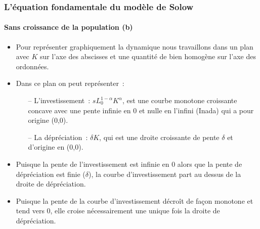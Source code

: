 \documentclass[10pt,notheorems]{beamer}
\theoremstyle{plain}
\theoremstyle{definition} %
\begin{document}
\begin{frame}
  \frametitle{L'équation fondamentale du modèle de Solow}
  \framesubtitle{Sans croissance de la population (b)}

  \bigskip

  \begin{itemize}

  \item Pour représenter graphiquement la dynamique nous travaillons dans un plan avec $K$ sur l'axe des abscisses et une quantité de bien homogène sur l'axe des ordonnées.\newline

  \item Dans ce plan on peut représenter~:
    \medskip
    \begin{itemize}
    \item[--] {\color{blue} L'investissement~:} $sL_0^{1-\alpha}K^{\alpha}$, est une courbe monotone croissante concave avec une pente infinie en 0 et nulle en l'infini (Inada) qui a pour origine (0,0).\newline
    \item[--] {\color{blue} La dépréciation~:} $\delta K$, qui est une droite croissante de pente $\delta$ et d'origine en (0,0).\newline
    \end{itemize}

  \item Puisque la pente de l'investissement est infinie en 0 alors que la pente de dépréciation est finie ($\delta$), la courbe d'investissement part au dessus de la droite de dépréciation.\newline

  \item Puisque la pente de la courbe d'investissement décroît de façon monotone et tend vers 0, elle croise nécessairement une unique fois la droite de dépréciation.
  \end{itemize}

\end{frame}
\end{document}
